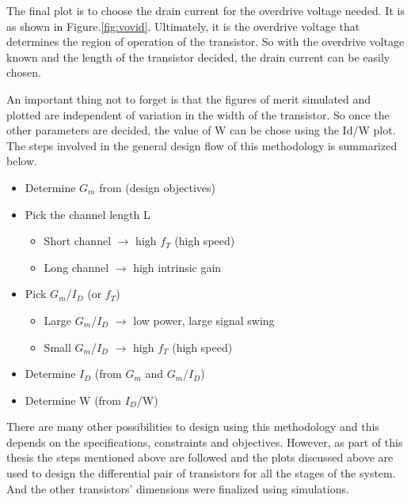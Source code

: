 The final plot is to choose the drain current for the overdrive voltage needed. It is as shown in Figure.\ref{fig:vovid}. Ultimately, it is the overdrive voltage that determines the region of operation of the transistor. So with the overdrive voltage known and the length of the transistor decided, the drain current can be easily chosen.

An important thing not to forget is that the figures of merit simulated and plotted are independent of variation in the width of the transistor. So once the other parameters are decided, the value of W can be chose using the Id/W plot. The steps involved in the general design flow of this methodology is summarized below.
\begin{itemize}
\item Determine $G_m$ from (design objectives)
\item Pick the channel length L
	\begin{itemize}
	\item Short channel $\rightarrow$ high $f_T$ (high speed)
	\item Long channel $\rightarrow$ high intrinsic gain
	\end{itemize}
\item Pick $G_m$/$I_D$ (or $f_T$)
	\begin{itemize}
	\item Large $G_m$/$I_D$ $\rightarrow$ low power, large signal swing
	\item Small $G_m$/$I_D$ $\rightarrow$ high $f_T$ (high speed)
	\end{itemize}
\item Determine $I_D$ (from $G_m$ and $G_m$/$I_D$)
\item Determine W (from $I_D$/W)
\end{itemize}

There are many other possibilities to design using this methodology and this depends on the specifications, constraints and objectives. However, as part of this thesis the steps mentioned above are followed and the plots discussed above are used to design the differential pair of transistors for all the stages of the system. And the other transistors' dimensions were finalized using simulations.
